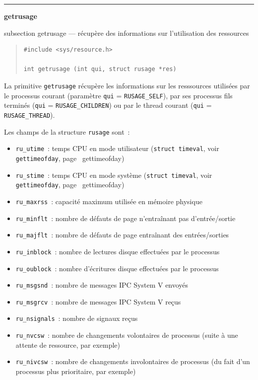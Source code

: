 \documentclass [twoside] {report}
\newcommand {\primitive} [1]
    {
	\phantomsection
	{\large \textbf {#1}}
	\addcontentsline {toc} {subsection} {#1}
    }
\newcommand {\separation}
    {
	\vspace {5mm}
	\nopagebreak
	\hrule
    }
\begin{document}
\separation
\primitive {getrusage} --- récupère des informations sur l'utilisation des ressources
    \label {getrusage}

\begin {quote}
\begin {verbatim}
#include <sys/resource.h>

int getrusage (int qui, struct rusage *res)
\end{verbatim}
\end {quote}

La primitive \texttt {getrusage} récupère les informations sur les
resssources utilisées par le processus courant (paramètre \texttt {qui}
= \texttt {RUSAGE\_SELF}), par ses processus fils terminés (\texttt {qui}
= \texttt {RUSAGE\_CHILDREN}) ou par le thread courant (\texttt {qui}
= \texttt {RUSAGE\_THREAD}).

Les champs de la structure \texttt {rusage} sont~:

\begin {itemize}
    \item \texttt {ru\_utime}~: temps CPU en mode utilisateur (\texttt
	{struct timeval}, voir \texttt {gettimeofday}, page~\pageref
	{gettimeofday})
    \item \texttt {ru\_stime}~: temps CPU en mode système (\texttt
	{struct timeval}, voir \texttt {gettimeofday}, page~\pageref
	{gettimeofday})
    \item \texttt {ru\_maxrss}~: capacité maximum utilisée en mémoire
	physique
    \item \texttt {ru\_minflt}~: nombre de défauts de page n'entraînant
	pas d'entrée/sortie
    \item \texttt {ru\_majflt}~: nombre de défauts de page entraînant
	des entrées/sorties
    \item \texttt {ru\_inblock}~: nombre de lectures disque effectuées
	par le processus
    \item \texttt {ru\_oublock}~: nombre d'écritures disque effectuées
	par le processus
    \item \texttt {ru\_msgsnd}~: nombre de messages IPC System V envoyés
    \item \texttt {ru\_msgrcv}~: nombre de messages IPC System V reçus
    \item \texttt {ru\_nsignals}~: nombre de signaux reçus \item \texttt
    {ru\_nvcsw}~: nombre de changements volontaires de
	processus (suite à une attente de ressource, par exemple)
    \item \texttt {ru\_nivcsw}~: nombre de changements involontaires
	de processus (du fait d'un processus plus prioritaire, par
	exemple)

\end {itemize}
\end{document}
